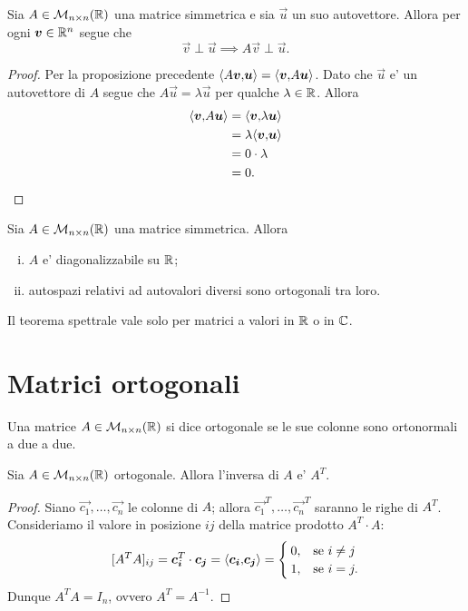 \begin{proposition}
    Sia $A \in \mathcal{M}_{n \times n}(\mathbb{R})$ una matrice simmetrica e sia $\vec u$ un suo autovettore. Allora per ogni $\bm{v} \in \mathbb{R}^n$ segue che\[
        \vec v \perp \vec u \implies A \vec v \perp \vec u.    
    \]
\end{proposition}
\begin{proof}
    Per la proposizione precedente $\langle A\bm{v}{,}\bm{u}\rangle = \langle \bm{v}{,}A\bm{u}\rangle$. Dato che $\vec u$ e' un autovettore di $A$ segue che $A\vec u = \lambda\vec u$ per qualche $\lambda \in \mathbb{R}$. Allora \begin{align*}
        \langle \bm{v}{,}A\bm{u}\rangle &= \langle \bm{v}{,}\lambda\bm{u}\rangle\\
            &= \lambda\langle \bm{v}{,}\bm{u}\rangle\\
            &= 0 \cdot \lambda\\
            &= 0. \qedhere
    \end{align*}
\end{proof}

\begin{theorem}
    Sia $A \in \mathcal{M}_{n \times n}(\mathbb{R})$ una matrice simmetrica. Allora \begin{enumerate}[(i)]
        \item $A$ e' diagonalizzabile su $\mathbb{R}$;
        \item autospazi relativi ad autovalori diversi sono ortogonali tra loro.
    \end{enumerate}
\end{theorem}

Il teorema spettrale vale solo per matrici a valori in $\mathbb{R}$ o in $\mathbb{C}$.

\section{Matrici ortogonali}

\begin{definition}
    Una matrice $A \in \mathcal{M}_{n \times n}(\mathbb{R})$ si dice ortogonale se le sue colonne sono ortonormali a due a due.
\end{definition}

\begin{proposition}
    Sia $A \in \mathcal{M}_{n \times n}(\mathbb{R})$ ortogonale. Allora l'inversa di $A$ e' $A^T$.
\end{proposition}
\begin{proof}
    Siano $\vec{c_1}, \dots, \vec{c_n}$ le colonne di $A$; allora $\vec{c_1}^T, \dots, \vec{c_n}^T$ saranno le righe di $A^T$. Consideriamo il valore in posizione $ij$ della matrice prodotto $A^T \cdot A$:
    \[
        [A^TA]_{ij} = \bm{c_i}^T \cdot \bm{c_j} = \langle \bm{c_i}{,}\bm{c_j}\rangle = \begin{cases}
            0, &\text{se } i \neq j \\
            1, &\text{se } i = j.
        \end{cases}
    \]
    Dunque $A^TA = I_n$, ovvero $A^T = A^{-1}$.
\end{proof}


